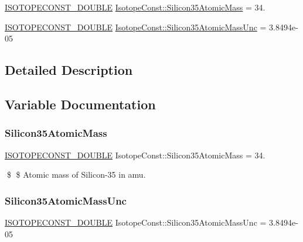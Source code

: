 \begin{DoxyCompactItemize}
\item 
\mbox{\hyperlink{group___isotope_const-_macros_ga8f45a7272ce02c0b4c65c44636ed719a}{I\+S\+O\+T\+O\+P\+E\+C\+O\+N\+S\+T\+\_\+\+D\+O\+U\+B\+LE}} \mbox{\hyperlink{group___isotope_const-_silicon-_si35_ga71baea0738c7ff79a23e0eb54d62f156}{Isotope\+Const\+::\+Silicon35\+Atomic\+Mass}} = 34.
\item 
\mbox{\hyperlink{group___isotope_const-_macros_ga8f45a7272ce02c0b4c65c44636ed719a}{I\+S\+O\+T\+O\+P\+E\+C\+O\+N\+S\+T\+\_\+\+D\+O\+U\+B\+LE}} \mbox{\hyperlink{group___isotope_const-_silicon-_si35_ga46b7d79668af6bfad181a8e899151b89}{Isotope\+Const\+::\+Silicon35\+Atomic\+Mass\+Unc}} = 3.\+8494e-\/05
\end{DoxyCompactItemize}


\subsection{Detailed Description}


\subsection{Variable Documentation}
\mbox{\label{group___isotope_const-_silicon-_si35_ga71baea0738c7ff79a23e0eb54d62f156}} 
\subsubsection{\texorpdfstring{Silicon35\+Atomic\+Mass}{Silicon35AtomicMass}}
{\footnotesize\ttfamily \mbox{\hyperlink{group___isotope_const-_macros_ga8f45a7272ce02c0b4c65c44636ed719a}{I\+S\+O\+T\+O\+P\+E\+C\+O\+N\+S\+T\+\_\+\+D\+O\+U\+B\+LE}} Isotope\+Const\+::\+Silicon35\+Atomic\+Mass = 34.}

\$ \$ Atomic mass of Silicon-\/35 in amu. \mbox{\label{group___isotope_const-_silicon-_si35_ga46b7d79668af6bfad181a8e899151b89}} 
\subsubsection{\texorpdfstring{Silicon35\+Atomic\+Mass\+Unc}{Silicon35AtomicMassUnc}}
{\footnotesize\ttfamily \mbox{\hyperlink{group___isotope_const-_macros_ga8f45a7272ce02c0b4c65c44636ed719a}{I\+S\+O\+T\+O\+P\+E\+C\+O\+N\+S\+T\+\_\+\+D\+O\+U\+B\+LE}} Isotope\+Const\+::\+Silicon35\+Atomic\+Mass\+Unc = 3.\+8494e-\/05}

